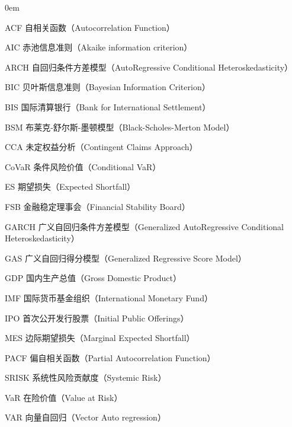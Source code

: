\begin{denotation}
\itemsep 0em

\item [ACF] 自相关函数（Autocorrelation Function）
\item [AIC] 赤池信息准则（Akaike information criterion）
\item [ARCH] 自回归条件方差模型（AutoRegressive Conditional Heteroskedasticity）
\item [BIC] 贝叶斯信息准则（Bayesian Information Criterion）
\item [BIS] 国际清算银行（Bank for International Settlement）
\item [BSM] 布莱克-舒尔斯-墨顿模型（Black-Scholes-Merton Model）
\item [CCA] 未定权益分析（Contingent Claims Approach）
\item [CoVaR] 条件风险价值（Conditional VaR）
\item [ES] 期望损失（Expected Shortfall）
\item [FSB] 金融稳定理事会（Financial Stability Board）
\item [GARCH] 广义自回归条件方差模型（Generalized AutoRegressive Conditional
Heteroskedasticity）
\item [GAS] 广义自回归得分模型（Generalized Regressive Score Model）
\item [GDP] 国内生产总值（Gross Domestic Product）
\item [IMF] 国际货币基金组织（International Monetary Fund）
\item [IPO] 首次公开发行股票（Initial Public Offerings）
\item [MES] 边际期望损失（Marginal Expected Shortfall）
\item [PACF] 偏自相关函数（Partial Autocorrelation Function）
\item [SRISK] 系统性风险贡献度（Systemic Risk）
\item [VaR] 在险价值（Value at Risk）
\item [VAR] 向量自回归（Vector Auto regression）
\end{denotation}
